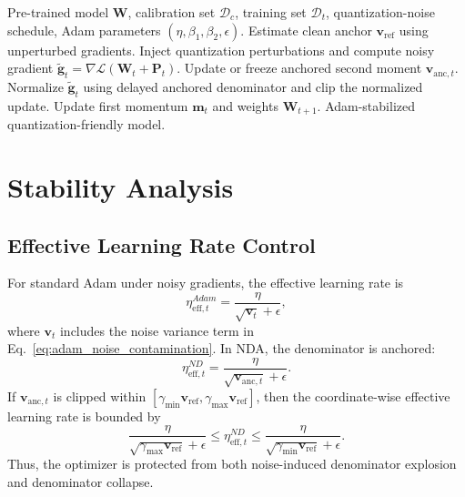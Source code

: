 \documentclass[journal]{IEEEtran}
\begin{document}
\begin{algorithm}[t]
\caption{Noise-Decoupled Adam}
\label{alg:noise_decoupled_adam}
\begin{algorithmic}[1]
 Pre-trained model $\boldsymbol{W}$, calibration set $\mathscr{D}_c$, training set $\mathscr{D}_t$, quantization-noise schedule, Adam parameters $(\eta,\beta_1,\beta_2,\epsilon)$.
\STATE Estimate clean anchor $\boldsymbol{v}_{\mathrm{ref}}$ using unperturbed gradients.
    \STATE Inject quantization perturbations and compute noisy gradient $\tilde{\boldsymbol{g}}_t=\nabla\mathcal{L}(\boldsymbol{W}_t+\boldsymbol{P}_t)$.
    \STATE Update or freeze anchored second moment $\boldsymbol{v}_{\mathrm{anc},t}$.
    \STATE Normalize $\tilde{\boldsymbol{g}}_t$ using delayed anchored denominator and clip the normalized update.
    \STATE Update first momentum $\boldsymbol{m}_t$ and weights $\boldsymbol{W}_{t+1}$.
\ENDFOR
{} Adam-stabilized quantization-friendly model.
\end{algorithmic}
\end{algorithm}

\section{Stability Analysis}

\subsection{Effective Learning Rate Control}
For standard Adam under noisy gradients, the effective learning rate is
\begin{equation}
    \eta_{\mathrm{eff},t}^{Adam}
    =
    \frac{\eta}{\sqrt{\boldsymbol{v}_t}+\epsilon},
\end{equation}
where $\boldsymbol{v}_t$ includes the noise variance term in Eq.~\eqref{eq:adam_noise_contamination}. In NDA, the denominator is anchored:
\begin{equation}
    \eta_{\mathrm{eff},t}^{ND}
    =
    \frac{\eta}{\sqrt{\boldsymbol{v}_{\mathrm{anc},t}}+\epsilon}.
\end{equation}
If $\boldsymbol{v}_{\mathrm{anc},t}$ is clipped within $[\gamma_{\min}\boldsymbol{v}_{\mathrm{ref}},\gamma_{\max}\boldsymbol{v}_{\mathrm{ref}}]$, then the coordinate-wise effective learning rate is bounded by
\begin{equation}
    \frac{\eta}{\sqrt{\gamma_{\max}\boldsymbol{v}_{\mathrm{ref}}}+\epsilon}
    \leq
    \eta_{\mathrm{eff},t}^{ND}
    \leq
    \frac{\eta}{\sqrt{\gamma_{\min}\boldsymbol{v}_{\mathrm{ref}}}+\epsilon}.
\end{equation}
Thus, the optimizer is protected from both noise-induced denominator explosion and denominator collapse.
\end{document}
